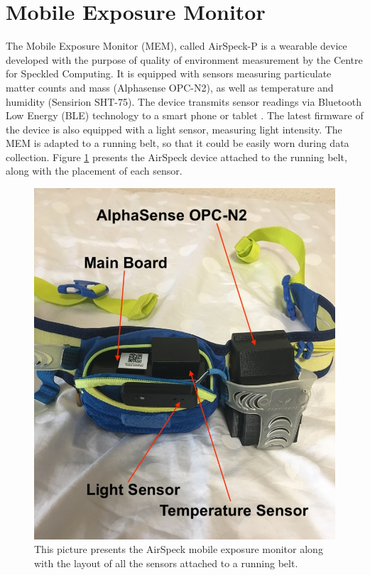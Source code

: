 \documentclass[bsc,frontabs,twoside,singlespacing, parskip,deptreport]{infthesis}     %
\begin{document}
\section{Mobile Exposure Monitor}

The Mobile Exposure Monitor (MEM), called AirSpeck-P is a wearable device developed with the purpose of quality of environment measurement by the Centre for Speckled Computing. It is equipped with sensors measuring particulate matter counts and mass (Alphasense OPC-N2), as well as temperature and humidity (Sensirion SHT-75). The device transmits sensor readings via Bluetooth Low Energy (BLE) technology to a smart phone or tablet \cite{airspeck}. The latest firmware of the device is also equipped with a light sensor, measuring light intensity. The MEM is adapted to a running belt, so that it could be easily worn during data collection. Figure \ref{fig:airspeck} presents the AirSpeck device attached to the running belt, along with the placement of each sensor.

\begin{figure}[h!]
  \center
  \includegraphics[width=\columnwidth]{airspeck.jpeg} 
  \caption{This picture presents the AirSpeck mobile exposure monitor along with the layout of all the sensors attached to a running belt.}
  \label{fig:airspeck}
\end{figure}
\end{document}
